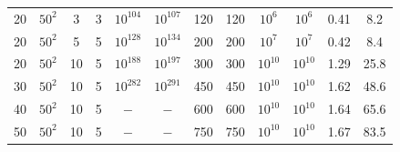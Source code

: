 \begin{table}[!t]
\begin{tabular}{cccccccccccc}
\rowcolor[rgb]{0.925,0.957,1} 20 & $50^2$  & 3         & 3       & $10^{104}$  & $10^{107}$                                                               & 120    & 120                                                                                   & $10^{6}$     & $10^{6}$     & 0.41   & 8.2                                                                                                  \\
20                               & $50^2$  & 5         & 5       & $10^{128}$  & $10^{134}$                                                               & 200    & 200                                                                                   & $10^{7}$     & $10^{7}$     & 0.42   & 8.4                                                                                                  \\
\rowcolor[rgb]{0.925,0.957,1} 20 & $50^2$  & 10        & 5       & $10^{188}$  & $10^{197}$                                                               & 300    & 300                                                                                   & $10^{10}$    & $10^{10}$    & 1.29   & 25.8                                                                                                 \\
30                               & $50^2$  & 10        & 5       & $10^{282}$  & $10^{291}$                                                               & 450    & 450                                                                                   & $10^{10}$    & $10^{10}$    & 1.62   & 48.6                                                                                                 \\
\rowcolor[rgb]{0.925,0.957,1} 40 & $50^2$  & 10        & 5       & $-$         & $-$                                                                      & 600    & 600                                                                                   & $10^{10}$    & $10^{10}$    & 1.64   & 65.6                                                                                                 \\
50                               & $50^2$  & 10        & 5       & $-$         & $-$                                                                      & 750    & 750                                                                                   & $10^{10}$    & $10^{10}$    & 1.67   & 83.5                                                                                                 \\

\end{tabular}
\end{table}
